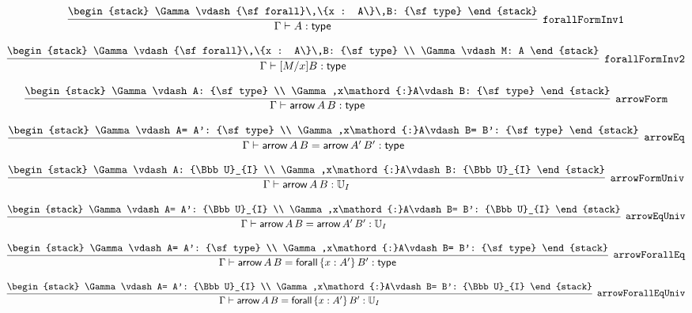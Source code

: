 \[
\infer[{\tt forallFormInv1}]{\Gamma \vdash A: {\sf type}}{
\begin{stack}
\Gamma \vdash {\sf forall}\,\{x : A\}\,B: {\sf type}
\end{stack}}
\]

\[
\infer[{\tt forallFormInv2}]{\Gamma \vdash [M/x]B: {\sf type}}{
\begin{stack}
\Gamma \vdash {\sf forall}\,\{x : A\}\,B: {\sf type}
\\
\Gamma \vdash M: A
\end{stack}}
\]

\[
\infer[{\tt arrowForm}]{\Gamma \vdash {\sf arrow}\,A\,B: {\sf type}}{
\begin{stack}
\Gamma \vdash A: {\sf type}
\\
\Gamma ,x\mathord{:}A\vdash B: {\sf type}
\end{stack}}
\]

\[
\infer[{\tt arrowEq}]{\Gamma \vdash {\sf arrow}\,A\,B= {\sf arrow}\,A'\,B': {\sf type}}{
\begin{stack}
\Gamma \vdash A= A': {\sf type}
\\
\Gamma ,x\mathord{:}A\vdash B= B': {\sf type}
\end{stack}}
\]

\[
\infer[{\tt arrowFormUniv}]{\Gamma \vdash {\sf arrow}\,A\,B: {\Bbb U}_{I}}{
\begin{stack}
\Gamma \vdash A: {\Bbb U}_{I}
\\
\Gamma ,x\mathord{:}A\vdash B: {\Bbb U}_{I}
\end{stack}}
\]

\[
\infer[{\tt arrowEqUniv}]{\Gamma \vdash {\sf arrow}\,A\,B= {\sf arrow}\,A'\,B': {\Bbb U}_{I}}{
\begin{stack}
\Gamma \vdash A= A': {\Bbb U}_{I}
\\
\Gamma ,x\mathord{:}A\vdash B= B': {\Bbb U}_{I}
\end{stack}}
\]

\[
\infer[{\tt arrowForallEq}]{\Gamma \vdash {\sf arrow}\,A\,B= {\sf forall}\,\{x : A'\}\,B': {\sf type}}{
\begin{stack}
\Gamma \vdash A= A': {\sf type}
\\
\Gamma ,x\mathord{:}A\vdash B= B': {\sf type}
\end{stack}}
\]

\[
\infer[{\tt arrowForallEqUniv}]{\Gamma \vdash {\sf arrow}\,A\,B= {\sf forall}\,\{x : A'\}\,B': {\Bbb U}_{I}}{
\begin{stack}
\Gamma \vdash A= A': {\Bbb U}_{I}
\\
\Gamma ,x\mathord{:}A\vdash B= B': {\Bbb U}_{I}
\end{stack}}
\]

